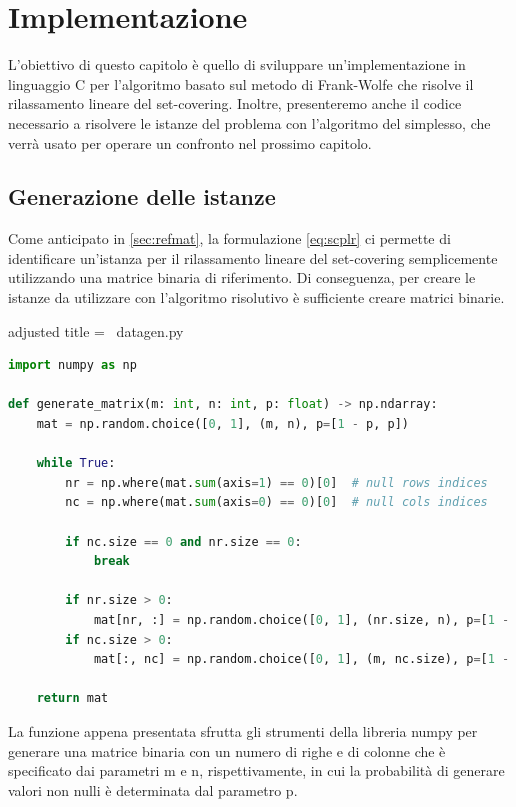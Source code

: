 \chapter{Implementazione}
L'obiettivo di questo capitolo è quello di sviluppare un'implementazione in linguaggio C per l'algoritmo basato sul
metodo di Frank-Wolfe che risolve il rilassamento lineare del set-covering. Inoltre, presenteremo anche il codice
necessario a risolvere le istanze del problema con l'algoritmo del simplesso, che verrà usato per operare un confronto
nel prossimo capitolo.

\section{Generazione delle istanze}
Come anticipato in \ref{sec:refmat}, la formulazione \eqref{eq:scplr} ci permette di identificare un'istanza per il
rilassamento lineare del set-covering semplicemente utilizzando una matrice binaria di riferimento. Di
conseguenza, per creare le istanze da utilizzare con l'algoritmo risolutivo è sufficiente creare matrici binarie.

\begin{code}{adjusted title = {\pyicon\ datagen.py}}
\begin{lstlisting}[language=python, style = style, caption={Generazione delle matrici binarie di riferimento.}, label =
{lst:genmat}]
import numpy as np

def generate_matrix(m: int, n: int, p: float) -> np.ndarray:
    mat = np.random.choice([0, 1], (m, n), p=[1 - p, p])

    while True:
        nr = np.where(mat.sum(axis=1) == 0)[0]  # null rows indices
        nc = np.where(mat.sum(axis=0) == 0)[0]  # null cols indices

        if nc.size == 0 and nr.size == 0:
            break

        if nr.size > 0:
            mat[nr, :] = np.random.choice([0, 1], (nr.size, n), p=[1 - p, p])
        if nc.size > 0:
            mat[:, nc] = np.random.choice([0, 1], (m, nc.size), p=[1 - p, p])

    return mat
\end{lstlisting}
\end{code}
\noindent
La funzione appena presentata sfrutta gli strumenti della libreria numpy per generare una matrice binaria con un numero
di righe e di colonne che è specificato dai parametri {\jbm m} e {\jbm n}, rispettivamente, in cui la probabilità
di generare valori non nulli è determinata dal parametro {\jbm p}.

